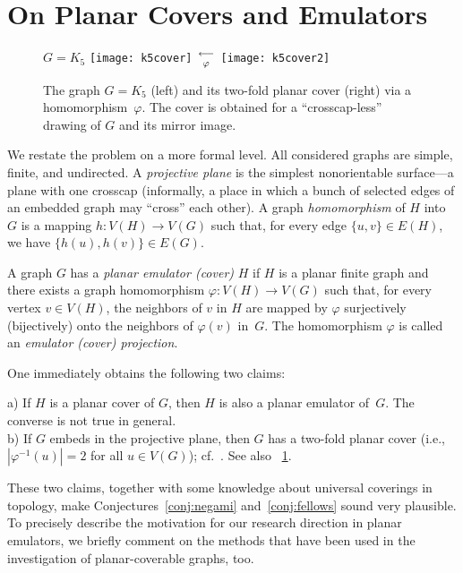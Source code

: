 \documentclass[envcountsect,envcountsame]{llncs}
\begin{document}
\section{On Planar Covers and Emulators}
\label{sec:emulators}


\begin{figure}[tb]\centering
$G=K_5$
\texttt{[image: k5cover]}
\qquad\raise 12mm\hbox{\normalsize\boldmath$\longleftarrow\atop\varphi$}\qquad
\texttt{[image: k5cover2]}\qquad~
\caption{The graph $G=K_5$ (left) and its two-fold planar cover (right) via
	a homomorphism~$\varphi$.
	The cover is obtained for a ``crosscap-less'' drawing of $G$ and its
	 mirror image.}
\label{fig:coverK5}
\end{figure}

We restate the problem on a more formal level.
All considered graphs are simple, finite, and undirected.
A {\em projective plane} is the simplest nonorientable surface---a plane
with one crosscap (informally, a place in which a bunch of selected edges 
of an embedded  graph may ``cross'' each other).
A graph {\em homomorphism} of $H$ into $G$ is a mapping
$h:V(H)\to V(G)$ such that, for every edge $\{u,v\}\in E(H)$,
we have $\{h(u),h(v)\}\in E(G)$.

\begin{definition}\label{def:emulator}
A graph $G$ has a {\em planar emulator (cover)} $H$ if $H$ is a planar finite graph 
and there exists a graph homomorphism $\varphi:V(H)\to V(G)$ such that,
for every vertex $v\in V(H)$, the neighbors of $v$ in $H$ are mapped by
$\varphi$ surjectively (bijectively) onto the neighbors of $\varphi(v)$ in~$G$.
The homomorphism $\varphi$ is called an {\em emulator (cover) projection}.
\end{definition}
\noindent
One immediately obtains the following two claims:

\begin{lemma}\label{lem:2fold}
a) If $H$ is a planar cover of $G$, then $H$ is also a planar emulator of~$G$.
The converse is not true in general.
\\
b) If $G$ embeds in the projective plane, then $G$ has a two-fold planar cover 
(i.e., $|\varphi^{-1}(u)|=2$ for all $u\in V(G)$); cf.~\cite{cit:double}.
See also \figurename~\ref{fig:coverK5}.
\end{lemma}
These two claims, together with some knowledge about universal coverings in topology, 
make Conjectures~\ref{conj:negami} and~\ref{conj:fellows} sound very plausible.
To precisely describe the motivation for our research direction in planar emulators, 
we briefly comment on the methods that have been used in the investigation
of planar-coverable graphs, too.
\end{document}
